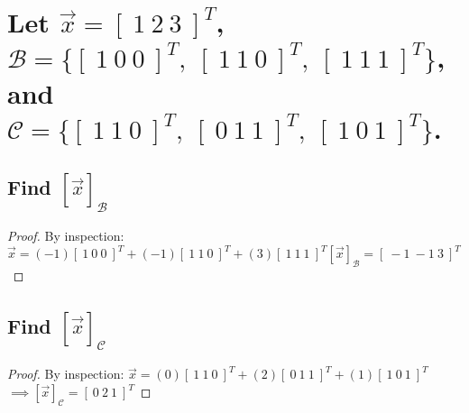 \documentclass[../main.tex]{subfiles}
\begin{document}
\section{Let $\vec{x} = [\ 1 \ 2 \ 3\ ]^T$, $\mathcal{B} = \{[\ 1 \ 0 \ 0\ ]^T, \  [\ 1 \ 1 \ 0\ ]^T, \ [\ 1 \ 1 \ 1\ ]^T \}$, and $\mathcal{C} = \{[\ 1 \ 1 \ 0\ ]^T, \  [\ 0 \ 1 \ 1\ ]^T, \ [\ 1 \ 0 \ 1\ ]^T \}$.}
\subsection{Find $[\vec{x}]_{\mathcal{B}}$}
        \begin{proof} By inspection: $\vec{x} = (-1)[\ 1 \ 0 \ 0\ ]^T + (-1)[\ 1 \ 1 \ 0\ ]^T + (3)[\ 1 \ 1 \ 1\ ]^T [\vec{x}]_{\mathcal{B}} =  [\ -1 \ -1 \ 3\ ]^T $
        \end{proof}
        \subsection{Find $[\vec{x}]_{\mathcal{C}}$}
\begin{proof}
        By inspection: $\vec{x} =(0)[\ 1 \ 1 \ 0\ ]^T + (2)[\ 0 \ 1 \ 1\ ]^T + (1)[\ 1 \ 0 \ 1\ ]^T$
        $\implies [\vec{x}]_{\mathcal{C}} = [\ 0 \ 2 \ 1\ ]^T$
\end{proof}
\end{document}
